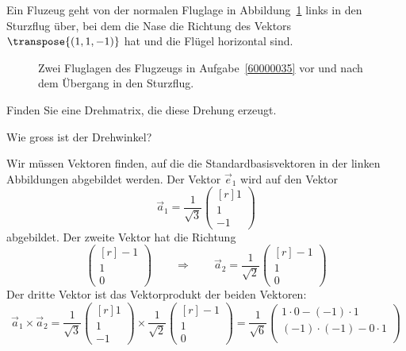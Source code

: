 Ein Fluzeug geht von der normalen Fluglage in Abbildung~\ref{60000035:fig}
links in den Sturzflug über, bei dem die Nase die Richtung des Vektors
$\transpose{(1,1,-1)}$ hat und die Flügel horizontal sind.
\begin{figure}[h]
\centering
{}
\caption{
Zwei Fluglagen des Flugzeugs in Aufgabe~\ref{60000035}
vor und nach dem Übergang in den Sturzflug.
\label{60000035:fig}}
\end{figure}
\begin{teilaufgaben}
\item Finden Sie eine Drehmatrix, die diese Drehung erzeugt.
\item Wie gross ist der Drehwinkel?
\end{teilaufgaben}

\begin{loesung}
\begin{teilaufgaben}
\item
Wir müssen Vektoren finden, auf die die Standardbasisvektoren in der 
linken Abbildungen abgebildet werden.
Der Vektor $\vec{e}_1$ wird auf den Vektor
\[
\vec{a}_1
=
\frac{1}{\sqrt{3}}\begin{pmatrix*}[r] 1\\1\\-1\end{pmatrix*}
\]
abgebildet.
Der zweite Vektor hat die Richtung
\[
\begin{pmatrix*}[r]-1\\1\\0\end{pmatrix*}
\qquad\Rightarrow\qquad
\vec{a}_2
=
\frac{1}{\sqrt{2}}
\begin{pmatrix*}[r]-1\\1\\0\end{pmatrix*}
\]
Der dritte Vektor ist das Vektorprodukt der beiden Vektoren:
\[
\vec{a}_1\times \vec{a}_2
=
\frac{1}{\sqrt{3}}
\begin{pmatrix*}[r] 1\\1\\-1\end{pmatrix*}
\times
\frac{1}{\sqrt{2}}
\begin{pmatrix*}[r]-1\\1\\0\end{pmatrix*}
=
\frac{1}{\sqrt{6}}
\begin{pmatrix}
1\cdot 0-(-1)\cdot 1\\
(-1)\cdot(-1)-0\cdot 1\\

\end{pmatrix}\]
\end{teilaufgaben}
\end{loesung}
